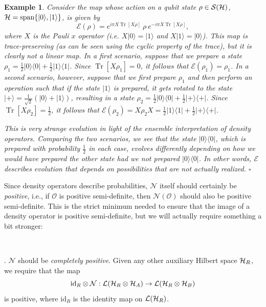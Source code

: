 \documentclass[a4paper,11pt]{article}
\newtheorem{example}[thm]{Example}
\newenvironment{eg}{\begin{example}  \rm  }{    \end{example} }
\newcommand{\eop}{{\hspace*{\fill}$\square$}}
\DeclareMathOperator{\Tr}{Tr}
\newcommand{\ket}[1]{|#1\rangle}
\newcommand{\ketbra}[2]{| #1 \rangle \langle #2 |}
\newcommand{\Hil}{{\cal H}}
\newcommand{\Oh}{{\mathcal{O}}}
\newcommand{\mrm}[1]{\mathrm{#1}}
\begin{document}
\begin{eg}
Consider the map whose action on a qubit state $\rho \in \mathcal{S}(\Hil)$, $\Hil = \mrm{span} \{\ket{0},\ket{1}\}$, is given by
\begin{equation}
\mathcal{E}(\rho) = e^{i\pi X \Tr[X \rho]} ~ \rho ~ e^{-i \pi X \Tr[X \rho]},
\end{equation}
where $X$ is the Pauli $x$ operator (i.e. $X\ket{0} = \ket{1}$ and $X \ket{1} = \ket{0}$).
This map is trace-preserving (as can be seen using the cyclic property of the trace), but it is clearly not a linear map.
In a first scenario, suppose that we prepare a state $\rho_1 = \tfrac{1}{2} \ketbra{0}{0} + \tfrac{1}{2} \ketbra{1}{1}$.
Since $\Tr[X \rho_1] = 0$, it follows that $\mathcal{E}(\rho_1) = \rho_1$.
In a second scenario, however, suppose that we first prepare $\rho_1$ and then perform an operation such that if the state $\ket{1}$ is prepared, it gets rotated to the state $\ket{+} = \tfrac{1}{\sqrt{2}}(\ket{0} + \ket{1})$, resulting in a state $\rho_2 = \tfrac{1}{2} \ketbra{0}{0} + \tfrac{1}{2}\ketbra{+}{+}$.
Since $\Tr[X \rho_2] = \tfrac{1}{2}$, it follows that $\mathcal{E}(\rho_2) = X \rho_2 X = \tfrac{1}{2} \ketbra{1}{1} + \tfrac{1}{2} \ketbra{+}{+}$.

This is very strange evolution in light of the ensemble interpretation of density operators.
Comparing the two scenarios, we see that the state $\ketbra{0}{0}$, which is prepared with probability $\tfrac{1}{2}$ in each case, evolves differently depending on how we \emph{would have} prepared the other state had we not prepared $\ketbra{0}{0}$.
In other words, $\mathcal{E}$ describes evolution that depends on possibilities that are not actually realized.
\eop
\end{eg}

\noindent Since density operators describe probabilities, $\mathcal{N}$ itself should certainly be \emph{positive}, i.e., if $\Oh$ is positive semi-definite, then $\mathcal{N}(\Oh)$ should also be positive semi-definite.
This is the strict minimum needed to ensure that the image of a density operator is positive semi-definite, but we will actually require something a bit stronger:

~

. $\mathcal{N}$ should be \emph{completely positive}. Given any other auxiliary Hilbert space $\Hil_R$, we require that the map
\begin{equation}
\mrm{id}_R \otimes \mathcal{N} : \mathcal{L}(\Hil_R \otimes \Hil_A) \rightarrow \mathcal{L}(\Hil_R \otimes \Hil_B)
\end{equation}
is positive, where $\mrm{id}_R$ is the identity map on $\mathcal{L}(\Hil_R)$.
\end{document}
